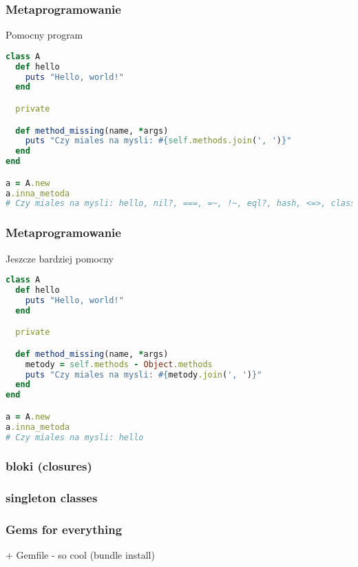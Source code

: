 \begin{frame}[fragile]
\frametitle{Metaprogramowanie}
\begin{block}{Pomocny program}
\begin{lstlisting}[language=Ruby,basicstyle=\tiny\ttfamily]
class A
  def hello
    puts "Hello, world!"
  end

  private

  def method_missing(name, *args)
    puts "Czy miales na mysli: #{self.methods.join(', ')}"
  end
end

a = A.new
a.inna_metoda
# Czy miales na mysli: hello, nil?, ===, =~, !~, eql?, hash, <=>, class, singleton_class, clone, dup, taint, tainted?, untaint, untrust, untrusted?, trust, freeze, frozen?, to_s, inspect, methods, singleton_methods, protected_methods, private_methods, public_methods, instance_variables, instance_variable_get, instance_variable_set, instance_variable_defined?, remove_instance_variable, instance_of?, kind_of?, is_a?, tap, send, public_send, respond_to?, extend, display, method, public_method, singleton_method, define_singleton_method, object_id, to_enum, enum_for, ==, equal?, !, !=, instance_eval, instance_exec, __send__, __id__
\end{lstlisting}
\end{block}
\end{frame}
\begin{frame}[fragile]
\frametitle{Metaprogramowanie}
\begin{block}{Jeszcze bardziej pomocny}
\begin{lstlisting}[language=Ruby,basicstyle=\tiny\ttfamily]
class A
  def hello
    puts "Hello, world!"
  end

  private

  def method_missing(name, *args)
    metody = self.methods - Object.methods
    puts "Czy miales na mysli: #{metody.join(', ')}"
  end
end

a = A.new
a.inna_metoda
# Czy miales na mysli: hello
\end{lstlisting}
\end{block}
\end{frame}


\begin{frame}[fragile]
\frametitle{bloki (closures)}
\end{frame}

\begin{frame}[fragile]
\frametitle{singleton classes}
\end{frame}

\begin{frame}[fragile]
\frametitle{Gems for everything}
 + Gemfile - so cool (bundle install)
\end{frame}

